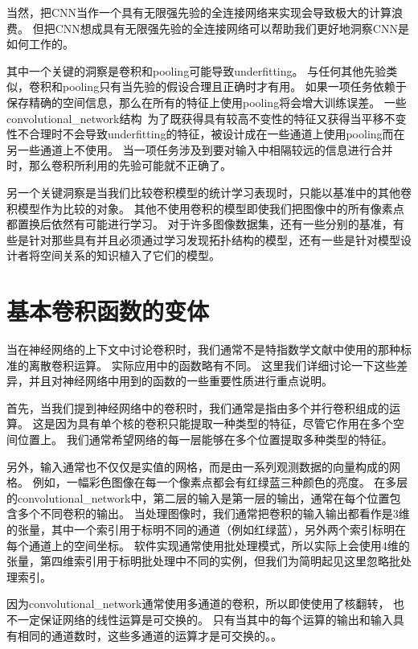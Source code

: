 当然，把\gls{CNN}当作一个具有无限强先验的全连接网络来实现会导致极大的计算浪费。
但把\gls{CNN}想成具有无限强先验的全连接网络可以帮助我们更好地洞察\gls{CNN}是如何工作的。

其中一个关键的洞察是卷积和\gls{pooling}可能导致\gls{underfitting}。
与任何其他先验类似，卷积和\gls{pooling}只有当先验的假设合理且正确时才有用。
如果一项任务依赖于保存精确的空间信息，那么在所有的特征上使用\gls{pooling}将会增大训练误差。
一些\gls{convolutional_network}结构~\citep{Szegedy-et-al-arxiv2014}为了既获得具有较高不变性的特征又获得当平移不变性不合理时不会导致\gls{underfitting}的特征，被设计成在一些通道上使用\gls{pooling}而在另一些通道上不使用。
当一项任务涉及到要对输入中相隔较远的信息进行合并时，那么卷积所利用的先验可能就不正确了。

另一个关键洞察是当我们比较卷积模型的统计学习表现时，只能以基准中的其他卷积模型作为比较的对象。
其他不使用卷积的模型即使我们把图像中的所有像素点都置换后依然有可能进行学习。
对于许多图像数据集，还有一些分别的基准，有些是针对那些具有并且必须通过学习发现拓扑结构的模型，还有一些是针对模型设计者将空间关系的知识植入了它们的模型。


\section{基本卷积函数的变体}
\label{sec:variants_of_the_basic_convolution_function}

当在神经网络的上下文中讨论卷积时，我们通常不是特指数学文献中使用的那种标准的离散卷积运算。
实际应用中的函数略有不同。
这里我们详细讨论一下这些差异，并且对神经网络中用到的函数的一些重要性质进行重点说明。

首先，当我们提到神经网络中的卷积时，我们通常是指由多个并行卷积组成的运算。
这是因为具有单个核的卷积只能提取一种类型的特征，尽管它作用在多个空间位置上。
我们通常希望网络的每一层能够在多个位置提取多种类型的特征。

另外，输入通常也不仅仅是实值的网格，而是由一系列观测数据的向量构成的网格。
例如，一幅彩色图像在每一个像素点都会有红绿蓝三种颜色的亮度。
在多层的\gls{convolutional_network}中，第二层的输入是第一层的输出，通常在每个位置包含多个不同卷积的输出。
当处理图像时，我们通常把卷积的输入输出都看作是3维的张量，其中一个索引用于标明不同的通道（例如红绿蓝），另外两个索引标明在每个通道上的空间坐标。
软件实现通常使用批处理模式，所以实际上会使用4维的张量，第四维索引用于标明批处理中不同的实例，但我们为简明起见这里忽略批处理索引。

因为\gls{convolutional_network}通常使用多通道的卷积，所以即使使用了核翻转， 也不一定保证网络的线性运算是可交换的。
只有当其中的每个运算的输出和输入具有相同的通道数时，这些多通道的运算才是可交换的。。

